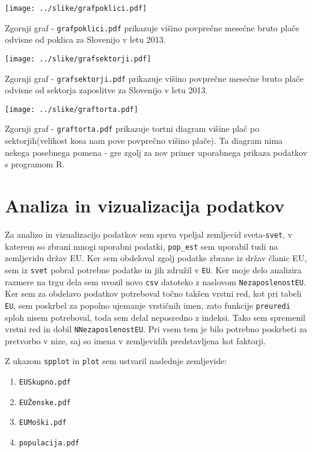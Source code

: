 \documentclass[11pt,a4paper]{article}
\begin{document}
\texttt{[image: ../slike/grafpoklici.pdf]}

Zgornji graf - \verb|grafpoklici.pdf| prikazuje višino povprečne mesećne bruto plače odvisne od poklica za Slovenijo v letu 2013.

\texttt{[image: ../slike/grafsektorji.pdf]}

Zgornji graf - \verb|grafsektorji.pdf| prikazuje višino povprečne mesećne bruto plače odvisne od sektorja zaposlitve za Slovenijo v letu 2013.

\texttt{[image: ../slike/graftorta.pdf]}

Zgornji graf - \verb|graftorta.pdf| prikazuje tortni diagram višine plač po sektorjih(velikost kosa nam pove povprečno višino plače). Ta diagram nima nekega posebnega pomena - gre zgolj za nov primer uporabnega prikaza podatkov s programom R.
\pagebreak
\section{Analiza in vizualizacija podatkov}

Za analizo in vizualizacijo podatkov sem sprva vpeljal zemljevid sveta-\verb|svet|, v katerem so zbrani mnogi uporabni podatki, \verb|pop_est| sem uporabil tudi na zemljevidu držav EU. Ker sem obdeloval zgolj podatke zbrane iz držav članic EU, sem iz \verb|svet| pobral potrebne podatke in jih združil v \verb|EU|. Ker moje delo analizira razmere na trgu dela sem uvozil novo \verb|csv| datoteko z naslovom \verb|NezaposlenostEU|. Ker sem za obdelavo podatkov potreboval točno takšen vrstni red, kot pri tabeli \verb|EU|, sem poskrbel za popolno ujemanje vrstičnih imen, zato funkcije \verb|preuredi| sploh nisem potreboval, toda sem delal neposredno z indeksi. Tako sem spremenil vrstni red in dobil \verb|NNezaposlenostEU|. Pri vsem tem je bilo potrebno poskrbeti za pretvorbo v nize, saj so imena v zemljevidih predstavljena kot faktorji.

Z ukazom \verb|spplot| in \verb|plot| sem ustvaril naslednje zemljevide:
\begin{enumerate} 
\item{\verb|EUSkupno.pdf|}

\item{\verb|EUŽenske.pdf|}

\item{\verb|EUMoški.pdf|}

\item{\verb|populacija.pdf|}
\end{enumerate}
\end{document}
